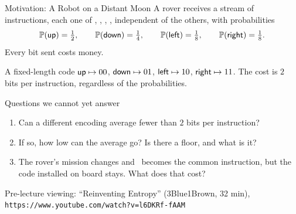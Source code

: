 \begin{frame}{Motivation: A Robot on a Distant Moon}
  \small
  A rover receives a stream of instructions, each one of \up, \down, \lft, \rgt, independent of the others, with probabilities
  \[
    \mathbb{P}(\textsf{up})=\tfrac12,\qquad \mathbb{P}(\textsf{down})=\tfrac14,\qquad \mathbb{P}(\textsf{left})=\tfrac18,\qquad \mathbb{P}(\textsf{right})=\tfrac18 .
  \]
  Every bit sent costs money.
  \begin{exampleblock}{A fixed-length code}
    $\textsf{up}\mapsto00$, $\textsf{down}\mapsto01$, $\textsf{left}\mapsto10$, $\textsf{right}\mapsto11$. The cost is $2$ bits per instruction, regardless of the probabilities.
  \end{exampleblock}
  \begin{block}{Questions we cannot yet answer}
    \begin{enumerate}
      \item Can a different encoding average fewer than $2$ bits per instruction?
      \item If so, how low can the average go? Is there a floor, and what is it?
      \item The rover's mission changes and \rgt\ becomes the common instruction, but the code installed on board stays. What does that cost?
    \end{enumerate}
  \end{block}
  \medskip
  {\color{soft}\footnotesize Pre-lecture viewing: ``Reinventing Entropy'' (3Blue1Brown, 32 min), \texttt{https://www.youtube.com/watch?v=l6DKRf-fAAM}}
\end{frame}

